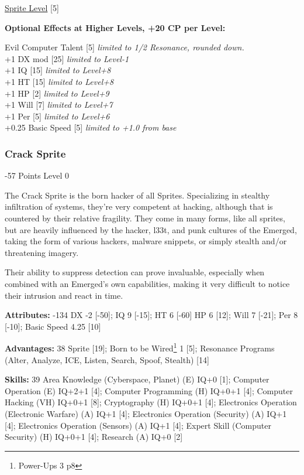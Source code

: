 \begin{multicols*}{3}
\hyperref[sprite_level]{Sprite Level} [5]

\textbf{Optional Effects at Higher Levels, +20 CP per Level:}

Evil Computer Talent [5] \textit{limited to 1/2 Resonance, rounded down.}\\
+1 DX mod [25] \textit{limited to Level-1}\\
+1 IQ [15] \textit{limited to Level+8}\\
+1 HT [15] \textit{limited to Level+8}\\
+1 HP [2] \textit{limited to Level+9}\\
+1 Will [7] \textit{limited to Level+7}\\
+1 Per [5] \textit{limited to Level+6}\\
+0.25 Basic Speed [5] \textit{limited to +1.0 from base}\\

\subsubsection{Crack Sprite}
\begin{flushright}
	-57 Points Level 0
\end{flushright}

The Crack Sprite is the born hacker of all Sprites. Specializing in stealthy infiltration of systems, they're very competent at hacking, although that is countered by their relative fragility. They come in many forms, like all sprites, but are heavily influenced by the hacker, l33t, and punk cultures of the Emerged, taking the form of various hackers, malware snippets, or simply stealth and/or threatening imagery.

Their ability to suppress detection can prove invaluable, especially when combined with an Emerged's own capabilities, making it very difficult to notice their intrusion and react in time.

\textbf{Attributes:} -134
DX -2 [-50]; IQ 9 [-15]; HT 6 [-60]
HP 6 [12]; Will 7 [-21]; Per 8 [-10]; Basic Speed 4.25 [10]

\textbf{Advantages:} 38
Sprite [19]; Born to be Wired\footnote{Power-Ups 3 p8} 1 [5]; Resonance Programs (Alter, Analyze, ICE, Listen, Search, Spoof, Stealth) [14]

\textbf{Skills:} 39
Area Knowledge (Cyberspace, Planet) (E) IQ+0 [1]; Computer Operation (E) IQ+2+1 [4]; Computer Programming (H) IQ+0+1 [4]; Computer Hacking (VH) IQ+0+1 [8]; Cryptography (H) IQ+0+1 [4]; Electronics Operation (Electronic Warfare) (A) IQ+1 [4]; Electronics Operation (Security) (A) IQ+1 [4]; Electronics Operation (Sensors) (A) IQ+1 [4]; Expert Skill (Computer Security) (H) IQ+0+1 [4]; Research (A) IQ+0 [2]


\end{multicols*}
